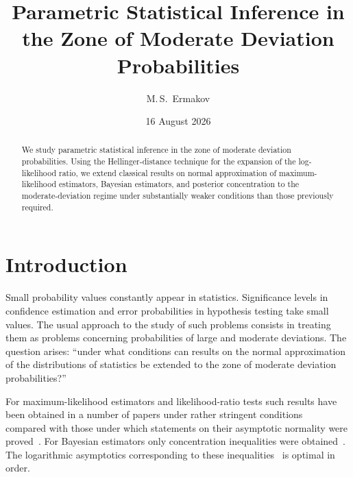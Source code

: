 \documentclass[11pt,a4paper]{article}
\title{Parametric Statistical Inference in the Zone of Moderate Deviation Probabilities}
\author{M.\,S.~Ermakov}
\date{16 August 2026}
\begin{document}
\maketitle

\begin{abstract}
We study parametric statistical inference in the zone of moderate deviation probabilities. Using the Hellinger-distance technique for the expansion of the log-likelihood ratio, we extend classical results on normal approximation of maximum-likelihood estimators, Bayesian estimators, and posterior concentration to the moderate-deviation regime under substantially weaker conditions than those previously required.
\end{abstract}

\section{Introduction}

Small probability values constantly appear in statistics. Significance levels in confidence estimation and error probabilities in hypothesis testing take small values. The usual approach to the study of such problems consists in treating them as problems concerning probabilities of large and moderate deviations. The question arises: ``under what conditions can results on the normal approximation of the distributions of statistics be extended to the zone of moderate deviation probabilities?''

For maximum-likelihood estimators and likelihood-ratio tests such results have been obtained in a number of papers under rather stringent conditions~\cite{1,2,8,11,14,17} compared with those under which statements on their asymptotic normality were proved~\cite{10,12,13,18}. For Bayesian estimators only concentration inequalities were obtained~\cite{10}. The logarithmic asymptotics corresponding to these inequalities~\cite{10} is optimal in order.
\end{document}
